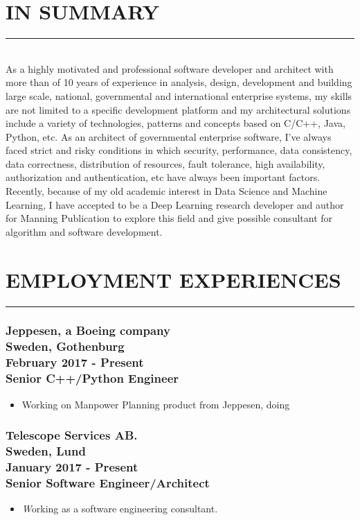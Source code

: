 \documentclass[10pt,a4paper]{article}
\begin{document}
\thispagestyle{fancy}

\section{IN SUMMARY}
\noindent \rule {3.5cm}{0.4pt} \\
As a highly motivated and professional software developer and architect with more than of 10 years of experience in analysis, design, development and building large scale, national, governmental and international enterprise systems, my skills are not limited to a specific development platform and my architectural solutions include a variety of technologies, patterns  and concepts based on C/C++, Java, Python, etc. As an architect of governmental enterprise software, I've always faced strict and risky conditions in which security, performance, data consistency, data correctness, distribution of resources, fault tolerance, high availability, authorization and authentication, etc have always been important factors. Recently, because of my old academic interest in Data Science and Machine Learning, I have accepted to be a Deep Learning research developer and author for Manning Publication to explore this field and give possible consultant for algorithm and software development.

\section{EMPLOYMENT EXPERIENCES}
\noindent \rule {7.3cm}{0.4pt}

\subsubsection{{\large Jeppesen, a Boeing company} \\ \textnormal{Sweden, Gothenburg} \\ \textnormal{February 2017 - Present} \\ {Senior C++/Python Engineer}}
  \setlength{\leftskip}{0.5cm}
  \setlength{\rightskip}{1cm}
  \begin{itemize}
    \setlength{\rightskip}{1cm}
    \setlength\itemsep{0em}
    \item Working on Manpower Planning product from Jeppesen, doing 
  \end{itemize}
  \setlength{\leftskip}{0pt}
  \setlength{\rightskip}{0cm}
  
\subsubsection{{\large Telescope Services AB.} \\ \textnormal{Sweden, Lund} \\ \textnormal{January 2017 - Present} \\ {Senior Software Engineer/Architect}}
  \setlength{\leftskip}{0.5cm}
  \setlength{\rightskip}{1cm}
  \begin{itemize}
    \setlength{\rightskip}{1cm}
    \setlength\itemsep{0em}
    \item \small \textit Working as a software engineering consultant. 
  \end{itemize}
  \setlength{\leftskip}{0pt}
  \setlength{\rightskip}{0cm}
  
\end{document}
